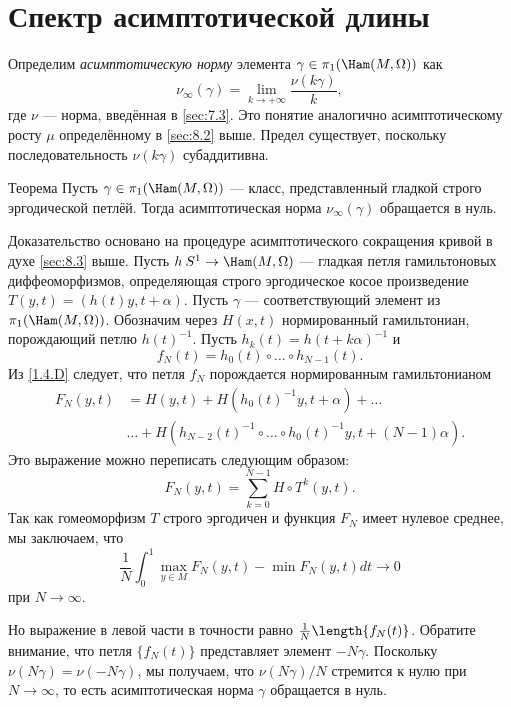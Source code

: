 \section{Спектр асимптотической длины}

Определим \emph{асимптотическую норму} элемента $\gamma\in\pi_1(\Ham(M, \Omega))$ как
\[\nu_\infty(\gamma)=\lim_{k\to+\infty}\frac{\nu(k\gamma)}{k},\]
где $\nu$ --- норма, введённая в \ref{sec:7.3}. 
Это понятие аналогично асимптотическому росту $\mu$ определённому в \ref{sec:8.2} выше.
Предел существует, поскольку последовательность $\nu(k\gamma)$ субаддитивна.

\begin{thm}{Теорема}\label{11.2.A}
Пусть $\gamma\in\pi_1(\Ham(M,\Omega))$ --- класс, представленный гладкой строго эргодической петлёй.
Тогда асимптотическая норма $\nu_\infty ​​(\gamma)$ обращается в нуль.
\end{thm}

Доказательство основано на процедуре асимптотического сокращения кривой в духе \ref{sec:8.3} выше.
Пусть $h\: S^1 \to \Ham(M,\Omega)$ --- гладкая петля гамильтоновых диффеоморфизмов, определяющая строго эргодическое косое произведение $T(y, t) = (h(t)y, t+\alpha)$.
Пусть $\gamma$ --- соответствующий элемент из $\pi_1(\Ham(M, \Omega))$.
Обозначим через $H(x, t)$ нормированный гамильтониан, порождающий петлю $h(t)^{-1}$.
Пусть $h_k(t) = h(t + k\alpha)^{-1}$ и  
\[f_N(t) = h_0(t) \circ \dots \circ h_{N-1}(t).\]
Из \ref{1.4.D} следует, что петля $f_N$ порождается нормированным гамильтонианом 
\begin{align*}
F_N(y,t)
&=
H(y,t)
+ H(h_0(t)^{-1}y,t+\alpha)
+\dots
\\
&\dots
+
H(h_{N-2} (t)^{-1} \circ \dots\circ h_0(t)^{-1}y, t + (N - 1)\alpha).
\end{align*}
Это выражение можно переписать следующим образом:
\[F_N(y, t) = \sum_{k=0}^{N-1} H\circ T^k(y, t).\]
Так как гомеоморфизм $T$ строго эргодичен и функция $F_N$ имеет нулевое среднее, мы заключаем, что
\[\frac1N\int_0^1\max_{y\in M}F_N(y, t) - \min F_N(y, t) dt \to 0\]
при $N \to \infty$.

Но выражение в левой части в точности равно $\frac1N\length\{f_N(t)\}$.
Обратите внимание, что петля $\{f_N(t)\}$ представляет элемент $-N\gamma$.
Поскольку $\nu(N\gamma) = \nu(-N\gamma)$, мы получаем, что $\nu(N\gamma)/N$ стремится к нулю при $N \to \infty$,
то есть асимптотическая норма $\gamma$ обращается в нуль.
\qeds

